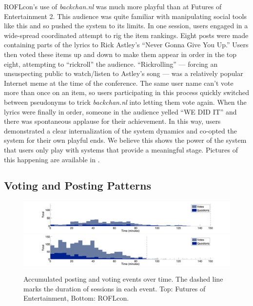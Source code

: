 ROFLcon's use of \emph{backchan.nl} was much more playful than at Futures of Entertainment 2. This audience was quite familiar with manipulating social tools like this and so pushed the system to its limits. In one session, users engaged in a wide-spread coordinated attempt to rig the item rankings. Eight posts were made containing parts of the lyrics to Rick Astley's ``Never Gonna Give You Up.'' \citep{Anonymous:2007ti} Users then voted these items up and down to make them appear in order in the top eight, attempting to ``rickroll'' the audience. ``Rickrolling'' --- forcing an unsuspecting public to watch/listen to Astley's song --- was a relatively popular Internet meme at the time of the conference. The same user name can't vote more than once on an item, so users participating in this process quickly switched between pseudonyms to trick \emph{backchan.nl} into letting them vote again. When the lyrics were finally in order, someone in the audience yelled ``WE DID IT'' and there was spontaneous applause for their achievement. In this way, users demonstrated a clear internalization of the system dynamics and co-opted the system for their own playful ends. We believe this shows the power of the system that users only play with systems that provide a meaningful stage. Pictures of this happening are available in \citep{Chillag:2008wr}.

\subsection{Voting and Posting Patterns}

\begin{figure}[t]
	\includegraphics{figures/backchannl/foe2_posting_history.png}
	\includegraphics{figures/backchannl/roflcon_figure.png}

	\caption{Accumulated posting and voting events over time. The dashed line marks the duration of sessions in each event. Top: Futures of Entertainment, Bottom: ROFLcon.}
	\label{fig:posting_time_patterns}
\end{figure}

